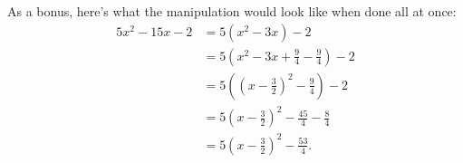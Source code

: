 \documentclass{ximera}
\begin{document}
\begin{exercise}
\begin{exercise}
\begin{exercise}
\begin{exercise}
\begin{exercise}
\begin{exercise}
As a bonus, here's what the manipulation would look like when done all at once:
\begin{align*}
5x^2 - 15x - 2 & = 5(x^2 - 3x) -2 \\
& = 5\left(x^2 - 3x + \frac{9}{4} - \frac{9}{4}\right) -2 \\
& = 5\left(\left(x - \frac{3}{2}\right)^2 - \frac{9}{4}\right) -2 \\
& = 5\left(x -\frac{3}{2}\right)^2 - \frac{45}{4} -\frac{8}{4}\\
& =5\left(x -\frac{3}{2}\right)^2 - \frac{53}{4}.
\end{align*}
\end{exercise}
\end{exercise}
\end{exercise}
\end{exercise}
\end{exercise}
\end{exercise}
\end{document}
